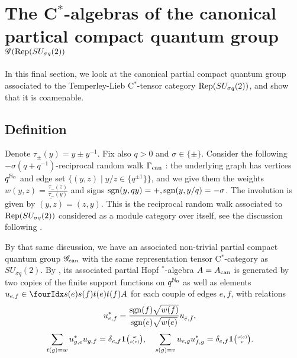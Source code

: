 \section{The C$^*$-algebras of the canonical partical compact quantum group $\mathscr{G}(\mathrm{Rep}(SU_{\sigma q}(2))$}\label{SecUni}

In this final section, we look at the canonical partial compact quantum group associated to the Temperley-Lieb C$^*$-tensor category $\mathrm{Rep}(SU_{\sigma q}(2))$, and show that it is coamenable.

\subsection{Definition}

Denote $\tau_{\pm}(y) = y\pm y^{-1}$. Fix also $q>0$ and $\sigma\in \{\pm\}$. Consider the following $-\sigma(q+q^{-1})$-reciprocal random walk $\Gamma_{\operatorname{\mathrm{can}}}$ \cite[Definition 5.1]{DCT1}: the underlying graph has vertices $q^{\mathbb{N}_0}$ and edge set $\{(y,z)\mid y/z \in \{q^{\pm 1}\}\}$, and we give them the weights $w(y,z) = \frac{\tau_-(z)}{\tau_-(y)}$ and signs $\operatorname{\mathrm{sgn}}(y,qy) = +, \operatorname{\mathrm{sgn}}(y,y/q) = -\sigma$. The involution is given by $\overline{(y,z)} = (z,y)$. This is the reciprocal random walk associated to $\mathrm{Rep}(SU_{\sigma q}(2))$ considered as a module category over itself, see the discussion following \cite[Definition 5.1]{DCT1}.

By that same discussion, we have an associated non-trivial partial compact quantum group $\mathscr{G}_{\operatorname{\mathrm{can}}}$ with the same representation tensor C$^*$-category as $SU_{\sigma q}(2)$. By \cite[Theorem 5.2]{DCT1}, its associated partial Hopf $^*$-algebra $A =A_{\operatorname{\mathrm{can}}}$ is generated by two copies of the finite support functions on $q^{\mathbb{N}_0}$ as well as elements $u_{e,f} \in \Gr{A}{s(e)}{t(e)}{s(f)}{t(f)}$ for each couple of edges $e,f$, with relations \begin{align*} &u_{e,f}^* = \frac{\operatorname{\mathrm{sgn}}(f)\sqrt{w(f)}}{\operatorname{\mathrm{sgn}}(e)\sqrt{w(e)}}u_{\bar{e},\bar{f}},\end{align*} \begin{align*}
 &\sum_{t(g) = w} u_{g,e}^* u_{g,f} = \delta_{e,f} \mathbf{1}{\tiny {\begin{pmatrix} w\\t(e)\end{pmatrix}}}, &&\sum_{s(g) = v} u_{e,g}u_{f,g}^* = \delta_{e,f} \mathbf{1}{\tiny {\begin{pmatrix} s(e)\\v\end{pmatrix}}}.\end{align*} 

